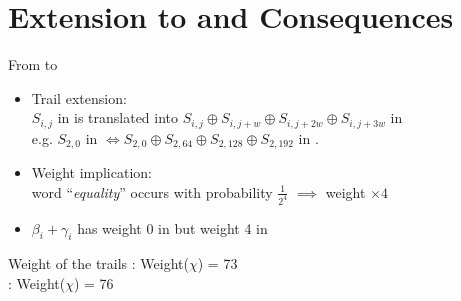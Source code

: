\documentclass[aspectratio=169,10pt,webfont]{beamer}
\begin{document}
\section{Extension to \MORUS and Consequences}


\begin{frame}{From \MiniMORUS to \MORUS}

\begin{itemize}
  \itemsep1.5em
  \item Trail extension:\\
    $S_{i,j}$ in \MiniMORUS is translated into $S_{i,j} \oplus S_{i,j + w} \oplus S_{i,j + 2w} \oplus S_{i,j + 3w}$ in \MORUS\\
    e.g. $S_{2,0}$ in \MiniMORUS[1280] $\iff S_{2,0} \oplus S_{2,64} \oplus S_{2,128} \oplus S_{2,192}$ in \MORUS[1280].
   \item Weight implication:\\
     word ``\textit{equality}'' occurs with probability $\frac{1}{2^4}$ $\implies$ weight $\times 4$\\

    \item $\beta_i + \gamma_i$ has weight 0 in \MiniMORUS but weight 4 in \MORUS\\
\end{itemize}

\begin{alertblock}{Weight of the trails}
  \centering
  \MORUS[640]: Weight($\chi$) = 73\\
  \MORUS[1280]: Weight($\chi$) = 76
\end{alertblock}

\end{frame}


\end{document}
